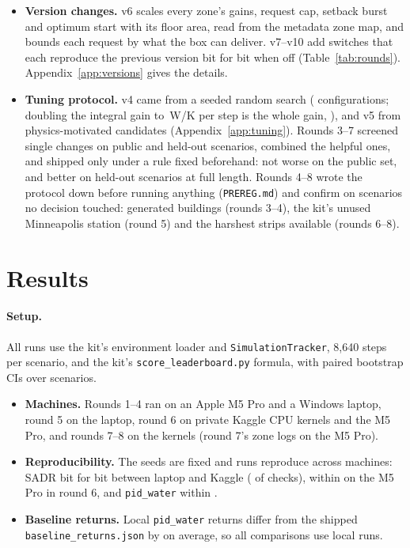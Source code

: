 \documentclass{article}
\begin{document}
\begin{itemize}
\begin{itemize}
  \end{itemize}
\item \textbf{Version changes.} v6 scales every zone's gains, request cap, setback burst and optimum start with its floor area, read from the metadata zone map, and bounds each request by what the box can deliver. v7--v10 add switches that each reproduce the previous version bit for bit when off (Table~\ref{tab:rounds}). Appendix~\ref{app:versions} gives the details.
\item \textbf{Tuning protocol.} v4 came from a seeded random search (\NTuneConfigs{} configurations; doubling the integral gain to \ParKiWPerKStep\,W/K per step is the whole gain, \AblRelDefAddKi), and v5 from \NCandV{} physics-motivated candidates (Appendix~\ref{app:tuning}). Rounds 3--7 screened single changes on public and held-out scenarios, combined the helpful ones, and shipped only under a rule fixed beforehand: not worse on the public set, and better on held-out scenarios at full length. Rounds 4--8 wrote the protocol down before running anything (\texttt{PREREG.md}) and confirm on scenarios no decision touched: generated buildings (rounds 3--4), the kit's unused Minneapolis station (round 5) and the harshest strips available (rounds 6--8).
\end{itemize}

\section{Results}
\label{sec:results}

\paragraph{Setup.} All runs use the kit's environment loader and \texttt{SimulationTracker}, 8,640 steps per scenario, and the kit's \texttt{score\_leaderboard.py} formula, with paired bootstrap CIs over scenarios.
\begin{itemize}
\item \textbf{Machines.} Rounds 1--4 ran on an Apple M5 Pro and a Windows laptop, round 5 on the laptop, round 6 on private Kaggle CPU kernels and the M5 Pro, and rounds 7--8 on the kernels (round 7's zone logs on the M5 Pro).
\item \textbf{Reproducibility.} The seeds are fixed and runs reproduce across machines: SADR bit for bit between laptop and Kaggle (\RSixReproIdentical{} of \RSixReproN{} checks), within \RSixMacReproMaxRel{} on the M5 Pro in round 6, and \texttt{pid\_water} within \MachineGapPidWater.
\item \textbf{Baseline returns.} Local \texttt{pid\_water} returns differ from the shipped \texttt{baseline\_returns.json} by \GapMeanPidWater{} on average, so all comparisons use local runs.
\end{itemize}
\end{document}
